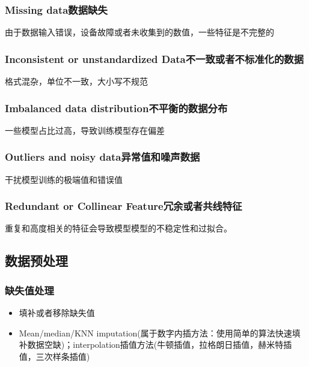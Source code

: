 \documentclass[UTF8]{ctexart}
\begin{document}
\subsubsection{Missing data数据缺失}
由于数据输入错误，设备故障或者未收集到的数值，一些特征是不完整的

\subsubsection{Inconsistent or unstandardized Data不一致或者不标准化的数据}
格式混杂，单位不一致，大小写不规范

\subsubsection{Imbalanced data distribution不平衡的数据分布}
一些模型占比过高，导致训练模型存在偏差
\subsubsection{Outliers and noisy data异常值和噪声数据}
干扰模型训练的极端值和错误值
\subsubsection{Redundant or Collinear Feature冗余或者共线特征}
重复和高度相关的特征会导致模型模型的不稳定性和过拟合。

\subsection{数据预处理}
\subsubsection{缺失值处理}
\begin{itemize}
    \item 填补或者移除缺失值
    \item Mean/median/KNN imputation(属于数字内插方法：使用简单的算法快速填补数据空缺)；interpolation插值方法(牛顿插值，拉格朗日插值，赫米特插值，三次样条插值)
\end{itemize}
\end{document}
